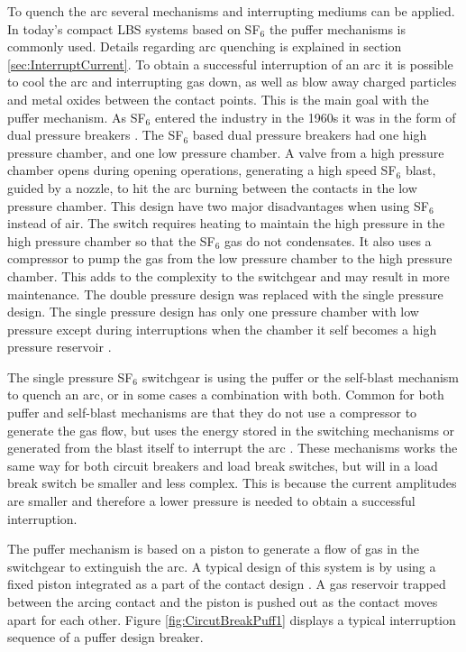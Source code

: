 \documentclass[10pt,a4paper]{article} %
\begin{document}
To quench the arc several mechanisms and interrupting mediums can be applied. In today's compact LBS systems based on SF$_6$ the puffer mechanisms is commonly used. Details regarding arc quenching is explained in section \ref{sec:InterruptCurrent}. To obtain a successful interruption of an arc it is possible to cool the arc and interrupting gas down, as well as blow away charged particles and metal oxides between the contact points. This is the main goal with the puffer mechanism. As SF$_6$ entered the industry in the 1960s it was in the form of dual pressure breakers \cite{bib:HVEbreak}. The SF$_6$ based dual pressure breakers had one high pressure chamber, and one low pressure chamber. A valve from a high pressure chamber opens during opening operations, generating a high speed SF$_6$ blast, guided by a nozzle, to hit the arc burning between the contacts in the low pressure chamber. This design have two major disadvantages when using SF$_6$ instead of air. The switch requires heating to maintain the high pressure in the high pressure chamber so that the SF$_6$ gas do not condensates. It also uses a compressor to pump the gas from the low pressure chamber to the high pressure chamber. This adds to the complexity to the switchgear and may result in more maintenance. The double pressure design was replaced with the single pressure design. The single pressure design has only one pressure chamber with low pressure except during interruptions when the chamber it self becomes a high pressure reservoir \cite{bib:HVEbreak}.

The single pressure SF$_6$ switchgear is using the puffer or the self-blast mechanism to quench an arc, or in some cases a combination with both. Common for both puffer and self-blast mechanisms are that they do not use a compressor to generate the gas flow, but uses the energy stored in the switching mechanisms or generated from the blast itself to interrupt the arc \cite{bib:HVEbreak}. These mechanisms works the same way for both circuit breakers and load break switches, but will in a load break switch be smaller and less complex. This is because the current amplitudes are smaller and therefore a lower pressure is needed to obtain a successful interruption.

The puffer mechanism is based on a piston to generate a flow of gas in the switchgear to extinguish the arc. A typical design of this system is by using a fixed piston integrated as a part of the contact design \cite{bib:HVEbreak}. A gas reservoir trapped between the arcing contact and the piston is pushed out as the contact moves apart for each other. Figure \ref{fig:CircutBreakPuff1} displays a typical interruption sequence of a puffer design breaker.
\end{document}
